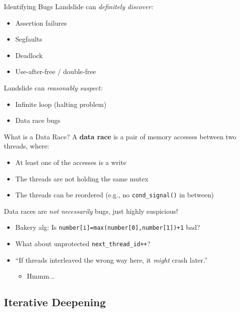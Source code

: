 \documentclass[xcolor=dvipsnames]{beamer}
\begin{document}
\begin{frame}{Identifying Bugs}
	Landslide can {\em definitely discover:}
	\begin{itemize}
		\item Assertion failures %
		\item Segfaults
		\item Deadlock
		\item Use-after-free / double-free
	\end{itemize}
	\linegap
	Landslide can {\em reasonably suspect:}
	\begin{itemize}
		\item Infinite loop (halting problem)
		\item Data race bugs
	\end{itemize}
\end{frame}

\begin{frame}{What is a Data Race?}
	A {\bf data race} is a pair of memory accesses between two threads, where:
	\begin{itemize}
		\item At least one of the accesses is a write
		\item The threads are not holding the same mutex
		\item The threads can be reordered (e.g., no \texttt{cond\_signal()} in between)
	\end{itemize}
	\pause
	\linegap

	Data races are {\em not necessarily} bugs, just highly suspicious!
	\begin{itemize}
		\item Bakery alg: Is {\tt number[i]=max(number[0],number[1])+1} bad?
		\item What about unprotected {\tt next\_thread\_id++}?
		\item ``If threads interleaved the wrong way here, it {\em might} crash later.''
		\begin{itemize}
			\item Hmmm...
		\end{itemize}
	\end{itemize}
\end{frame}


\subsection{Iterative Deepening}
\end{document}
